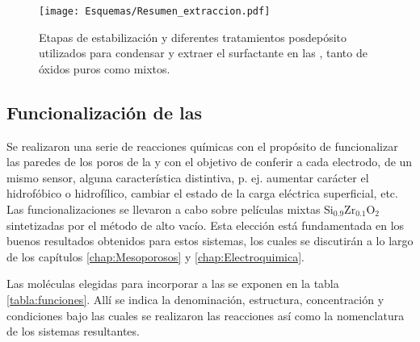 				\begin{figure}[ht!]
						  \begin{center}
						  \texttt{[image: Esquemas/Resumen\_extraccion.pdf]}
						  \caption[Tratamientos pos-depósito de \pdm]{Etapas de estabilización y diferentes tratamientos posdepósito utilizados para condensar y extraer el surfactante en las \pdm, tanto de óxidos puros como mixtos.}
						  \label{esq:peliculas_meso_tratamientos}
						  \end{center}
						  \end{figure}
    	
	\subsection{Funcionalización de las \pdm}\label{sub:funcionalizaci_n_de_las_pdm}
	
		Se realizaron una serie de reacciones químicas con el propósito de funcionalizar las paredes de los poros de la \pdm\space y con el objetivo de conferir a cada electrodo, de un mismo sensor, alguna característica distintiva, p. ej. aumentar carácter el hidrofóbico o hidrofílico, cambiar el estado de la carga eléctrica superficial, etc. Las funcionalizaciones se llevaron a cabo sobre películas mixtas Si$_{0.9}$Zr$_{0.1}$O$_2$ sintetizadas por el método de alto vacío. Esta elección está fundamentada en los buenos resultados obtenidos para estos sistemas, los cuales se discutirán a lo largo de los capítulos \ref{chap:Mesoporosos} y \ref{chap:Electroquimica}.

		Las moléculas elegidas para incorporar a las \pdmZ\space se exponen en la tabla \ref{tabla:funciones}. Allí se indica la denominación, estructura, concentración y condiciones bajo las cuales se realizaron las reacciones así como la nomenclatura de los sistemas resultantes.


